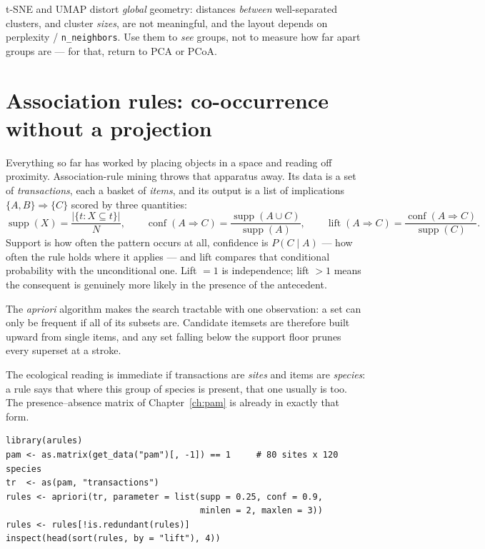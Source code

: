 \documentclass[11pt,oneside]{book}
\newcommand{\code}[1]{\texttt{#1}}
\begin{document}
\begin{pitfall}
t-SNE and UMAP distort \emph{global} geometry: distances \emph{between} well-separated
clusters, and cluster \emph{sizes}, are not meaningful, and the layout depends on
perplexity / \code{n\_neighbors}. Use them to \emph{see} groups, not to measure how far
apart groups are — for that, return to PCA or PCoA.
\end{pitfall}

\section{Association rules: co-occurrence without a projection}
Everything so far has worked by placing objects in a space and reading off proximity.
Association-rule mining \cite{Agrawal_1994} throws that apparatus away. Its data is a set
of \emph{transactions}, each a basket of \emph{items}, and its output is a list of
implications $\{A,B\}\Rightarrow\{C\}$ scored by three quantities:
\[
  \operatorname{supp}(X)=\frac{|\{t : X\subseteq t\}|}{N},\qquad
  \operatorname{conf}(A\Rightarrow C)=\frac{\operatorname{supp}(A\cup C)}{\operatorname{supp}(A)},\qquad
  \operatorname{lift}(A\Rightarrow C)=\frac{\operatorname{conf}(A\Rightarrow C)}{\operatorname{supp}(C)} .
\]
Support is how often the pattern occurs at all, confidence is $P(C\mid A)$ --- how often
the rule holds where it applies --- and lift compares that conditional probability with the
unconditional one. Lift $=1$ is independence; lift $>1$ means the consequent is genuinely
more likely in the presence of the antecedent.

The \emph{apriori} algorithm makes the search tractable with one observation: a set can
only be frequent if all of its subsets are. Candidate itemsets are therefore built upward
from single items, and any set falling below the support floor prunes every superset at a
stroke.

The ecological reading is immediate if transactions are \emph{sites} and items are
\emph{species}: a rule says that where this group of species is present, that one usually
is too. The presence--absence matrix of Chapter~\ref{ch:pam} is already in exactly that
form.

\begin{lstlisting}
library(arules)
pam <- as.matrix(get_data("pam")[, -1]) == 1     # 80 sites x 120 species
tr  <- as(pam, "transactions")
rules <- apriori(tr, parameter = list(supp = 0.25, conf = 0.9,
                                      minlen = 2, maxlen = 3))
rules <- rules[!is.redundant(rules)]
inspect(head(sort(rules, by = "lift"), 4))
\end{lstlisting}
\end{document}
